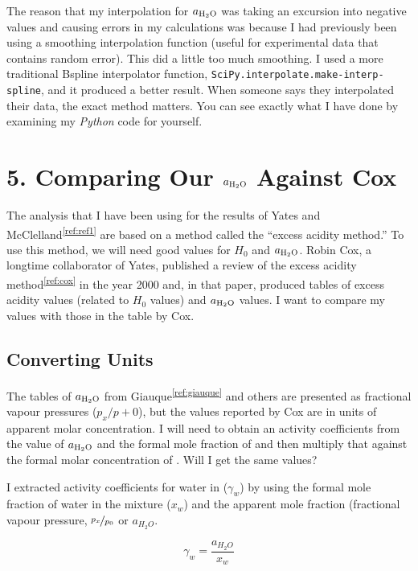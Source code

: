 \documentclass[]{tufte-handout}
\newcommand{\tss}[1]{\textsuperscript{#1}}
\begin{document}
The reason that my interpolation for $a_{\ce{H2O}}$ was taking an excursion into negative values and causing errors in my calculations was because I had previously been using a smoothing interpolation function (useful for experimental data that contains random error). This did a little too much smoothing. I used a more traditional Bspline interpolator function, \texttt{SciPy.interpolate.\-make-interp-spline}, and it produced a better result. When someone says they interpolated their data, the exact method matters. You can see exactly what I have done by examining my \textit{Python} code for yourself.

\section{5. Comparing Our $a_{\ce{H2O}}$ Against Cox}

The analysis that I have been using for the results of Yates and McClelland\tss{\ref{ref:ref1}} are based on a method called the ``excess acidity method.'' To use this method, we will need good values for $H_0$ and $a_{\ce{H2O}}$. Robin Cox, a longtime collaborator of Yates, published a review of the excess acidity method\tss{\ref{ref:cox}} in the year 2000 and, in that paper, produced tables of excess acidity values (related to $H_0$ values) and $a_{\ce{H2O}}$ values. I want to compare my values with those in the table by Cox.
\subsection{Converting Units}
The tables of $a_{\ce{H2O}}$ from Giauque\tss{\ref{ref:giauque}} and others are presented as fractional vapour pressures ($p_x / p+0$), but the values reported by Cox are in units of apparent molar concentration. I will need to obtain an activity coefficients from the value of  $a_{\ce{H2O}}$ and the formal mole fraction of  and then multiply that against the formal molar concentration of . Will I get the same values?

I extracted activity coefficients for water in  ($\gamma_w$) by using the formal mole fraction of water in the mixture ($x_w$) and the apparent mole fraction (fractional vapour pressure, $\nicefrac{p_x}{p_0}$ or $a_{H_2O}$. 

$$ \gamma_w = \frac{a_{H_2O}}{x_w} $$
\end{document}
